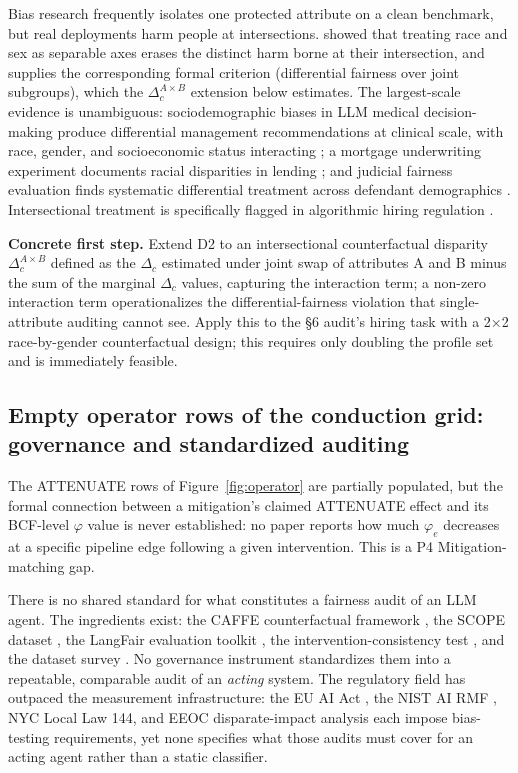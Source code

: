 \documentclass[acmsmall,nonacm]{acmart}
\begin{document}
Bias research frequently isolates one protected attribute on a clean benchmark, but real deployments harm people at intersections. \cite{crenshaw1989demarginalizing} showed that treating race and sex as separable axes erases the distinct harm borne at their intersection, and \cite{foulds2020intersectional} supplies the corresponding formal criterion (differential fairness over joint subgroups), which the $\Delta_c^{A \times B}$ extension below estimates. The largest-scale evidence is unambiguous: sociodemographic biases in LLM medical decision-making produce differential management recommendations at clinical scale, with race, gender, and socioeconomic status interacting \cite{omar2025sociodemographic}; a mortgage underwriting experiment documents racial disparities in lending \cite{bowen2024measuring}; and judicial fairness evaluation finds systematic differential treatment across defendant demographics \cite{hu2025llms}. Intersectional treatment is specifically flagged in algorithmic hiring regulation \cite{raghavan2020mitigating}.

\textbf{Concrete first step.} Extend D2 to an intersectional counterfactual disparity $\Delta_c^{A \times B}$ defined as the $\Delta_c$ estimated under joint swap of attributes A and B minus the sum of the marginal $\Delta_c$ values, capturing the interaction term; a non-zero interaction term operationalizes the differential-fairness violation \cite{foulds2020intersectional} that single-attribute auditing cannot see. Apply this to the \S{}6 audit's hiring task with a 2$\times$2 race-by-gender counterfactual design; this requires only doubling the profile set and is immediately feasible.

\subsection{Empty operator rows of the conduction grid: governance and standardized auditing}

The ATTENUATE rows of Figure~\ref{fig:operator} are partially populated, but the formal connection between a mitigation's claimed ATTENUATE effect and its BCF-level $\varphi$ value is never established: no paper reports how much $\varphi_e$ decreases at a specific pipeline edge following a given intervention. This is a P4 Mitigation-matching gap.

There is no shared standard for what constitutes a fairness audit of an LLM agent. The ingredients exist: the CAFFE counterfactual framework \cite{parziale2025systematic}, the SCOPE dataset \cite{parziale2026scope}, the LangFair evaluation toolkit \cite{bouchard2024bring}, the intervention-consistency test \cite{basu2026names}, and the dataset survey \cite{zhang2025datasets}. No governance instrument standardizes them into a repeatable, comparable audit of an \emph{acting} system. The regulatory field has outpaced the measurement infrastructure: the EU AI Act \cite{parliament2024regulation}, the NIST AI RMF \cite{nist2023artificial}, NYC Local Law 144, and EEOC disparate-impact analysis each impose bias-testing requirements, yet none specifies what those audits must cover for an acting agent rather than a static classifier.
\end{document}
